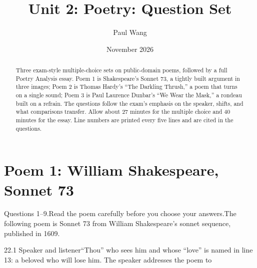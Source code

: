 \documentclass[11pt]{article}
\title{Unit 2: Poetry: Question Set}
\author{Paul Wang}
\date{November 2026}
\begin{document}
\maketitle

\begin{abstract}
Three exam-style multiple-choice sets on public-domain poems, followed by a full Poetry Analysis essay. Poem 1 is Shakespeare's Sonnet 73, a tightly built argument in three images; Poem 2 is Thomas Hardy's ``The Darkling Thrush,'' a poem that turns on a single sound; Poem 3 is Paul Laurence Dunbar's ``We Wear the Mask,'' a rondeau built on a refrain. The questions follow the exam's emphasis on the speaker, shifts, and what comparisons transfer. Allow about 27 minutes for the multiple choice and 40 minutes for the essay. Line numbers are printed every five lines and are cited in the questions.
\end{abstract}


\section{Poem 1: William Shakespeare, Sonnet 73}

\begin{poem}{Questions 1--9.\quad Read the poem carefully before you choose your answers.}{The following poem is Sonnet 73 from William Shakespeare's sonnet sequence, published in 1609.}
\end{poem}

\begin{q}{2}{2.1 Speaker and listener}{``Thou'' who sees him and whose ``love'' is named in line 13: a beloved who will lose him.}
The speaker addresses the poem to
\end{q}
\end{document}
